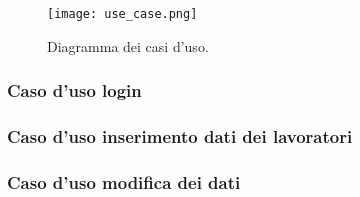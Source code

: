 \documentclass{article}
\begin{document}
    \begin{figure}[H]
        \texttt{[image: use\_case.png]}
        \caption{Diagramma dei casi d'uso.}
        \label{fig:use_case}
    \end{figure}
    
    \subsubsection{Caso d'uso login}
    \subsubsection{Caso d'uso inserimento dati dei lavoratori}
    \subsubsection{Caso d'uso modifica dei dati}
    
\end{document}
